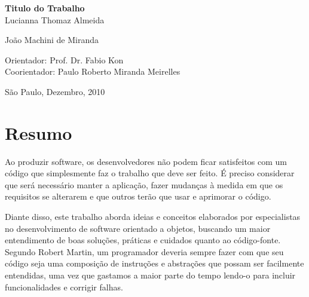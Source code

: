 \documentclass[11pt,a4paper]{book}
\begin{document}
\frontmatter 
\fancyhead[RO]{{\footnotesize\rightmark}\hspace{2em}\thepage}
\setcounter{tocdepth}{2}
\fancyhead[LE]{\thepage\hspace{2em}\footnotesize{\leftmark}}
\fancyhead[RE,LO]{}
\fancyhead[RO]{{\footnotesize\rightmark}\hspace{2em}\thepage}

\onehalfspacing  %

\thispagestyle{empty}
\begin{center}
    \vspace*{2.3cm}
    \textbf{\Large{Titulo do Trabalho}}\\
    
    \vspace*{1.2cm}
    \Large{Lucianna Thomaz Almeida}

    \vspace*{0.5cm}
	\Large{João Machini de Miranda}
    
    
    \vskip 3.5cm
    Orientador: Prof. Dr. Fabio Kon\\
    Coorientador: Paulo Roberto Miranda Meirelles

    \vskip 1.5cm
    \normalsize{São Paulo, Dezembro, 2010}
\end{center}



\chapter*{Resumo}

Ao produzir software, os desenvolvedores não podem ficar satisfeitos com um código que simplesmente faz o trabalho que deve ser feito. É preciso considerar que será necessário manter a aplicação, fazer mudanças à medida em que os requisitos se alterarem e que outros terão que usar e aprimorar o código.
%

Diante disso, este trabalho aborda ideias e conceitos elaborados por especialistas no desenvolvimento de software orientado a objetos, buscando um maior entendimento de boas soluções, práticas e cuidados quanto ao código-fonte. Segundo Robert Martin, um programador deveria sempre fazer com que seu código seja uma composição de instruções e abstrações que possam ser facilmente entendidas, uma vez que gastamos a maior parte do tempo lendo-o para incluir funcionalidades e corrigir falhas.
%
\end{document}

